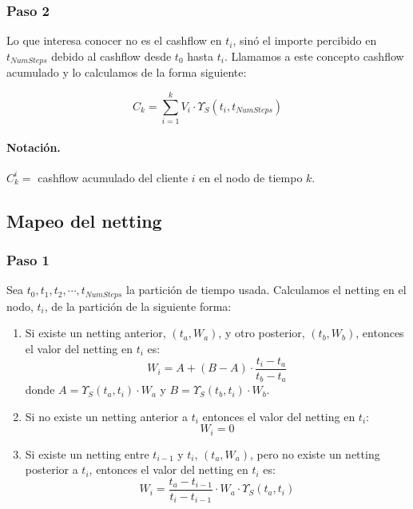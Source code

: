 \subsubsection{Paso 2}

Lo que interesa conocer no es el cashflow en $t_i$, sin\'o el importe
percibido en $t_{NumSteps}$ debido al cashflow desde $t_0$ hasta $t_i$.
Llamamos a este concepto cashflow acumulado y lo calculamos de la
forma siguiente:

\begin{displaymath}
C_k = \sum_{i=1}^{k} V_i \cdot \Upsilon_S(t_i,t_{NumSteps})
\end{displaymath}


\paragraph{Notaci\'on.} $C_k^i =$ cashflow acumulado del cliente $i$ en el
nodo de tiempo $k$.


\subsection{Mapeo del netting}

\subsubsection{Paso 1}

Sea $t_0, t_1, t_2, \cdots, t_{NumSteps}$ la partici\'on de tiempo usada.
Calculamos el netting en el nodo, $t_i$, de la partici\'on de la
siguiente forma:

\begin{enumerate}
\item Si existe un netting anterior, $(t_a,W_a)$, y otro posterior, $(t_b,W_b)$,
entonces el valor del netting en $t_i$ es:
\begin{displaymath}
W_i = A + (B-A) \cdot \frac{t_i-t_a}{t_b-t_a}
\end{displaymath}
donde
$A=\Upsilon_S(t_a,t_i) \cdot W_a$ y $B=\Upsilon_S(t_b,t_i) \cdot W_b$.
\item Si no existe un netting anterior a $t_i$ entonces el valor del netting
en $t_i$:
\begin{displaymath}
W_i = 0
\end{displaymath}
\item Si existe un netting entre $t_{i-1}$ y $t_i$, $(t_a,W_a)$, pero no existe un
netting posterior a $t_i$, entonces el valor del netting en $t_i$ es:
\begin{displaymath}
W_i = \frac{t_a-t_{i-1}}{t_i-t_{i-1}} \cdot W_a \cdot \Upsilon_S(t_a,t_i)
\end{displaymath}
\end{enumerate}


